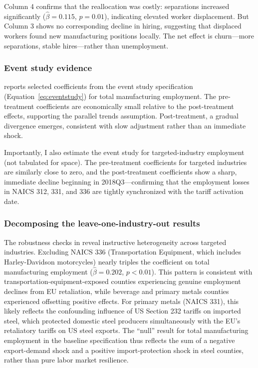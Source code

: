 \documentclass[12pt]{article}
\begin{document}
Column 4 confirms that the reallocation was costly: separations increased significantly ($\hat{\beta} = 0.115$, $p = 0.01$), indicating elevated worker displacement. But Column 3 shows no corresponding decline in hiring, suggesting that displaced workers found new manufacturing positions locally. The net effect is churn---more separations, stable hires---rather than unemployment.



\subsubsection*{Event study evidence}  reports selected coefficients from the event study specification (Equation~\ref{eq:eventstudy}) for total manufacturing employment. The pre-treatment coefficients are economically small relative to the post-treatment effects, supporting the parallel trends assumption. Post-treatment, a gradual divergence emerges, consistent with slow adjustment rather than an immediate shock.

Importantly, I also estimate the event study for targeted-industry employment (not tabulated for space). The pre-treatment coefficients for targeted industries are similarly close to zero, and the post-treatment coefficients show a sharp, immediate decline beginning in 2018Q3---confirming that the employment losses in NAICS 312, 331, and 336 are tightly synchronized with the tariff activation date.



\subsubsection*{Decomposing the leave-one-industry-out results} The robustness checks in  reveal instructive heterogeneity across targeted industries. Excluding NAICS 336 (Transportation Equipment, which includes Harley-Davidson motorcycles) nearly triples the coefficient on total manufacturing employment ($\hat{\beta} = 0.202$, $p < 0.01$). This pattern is consistent with transportation-equipment-exposed counties experiencing genuine employment declines from EU retaliation, while beverage and primary metals counties experienced offsetting positive effects. For primary metals (NAICS 331), this likely reflects the confounding influence of US Section 232 tariffs on imported steel, which protected domestic steel producers simultaneously with the EU's retaliatory tariffs on US steel exports. The ``null'' result for total manufacturing employment in the baseline specification thus reflects the sum of a negative export-demand shock and a positive import-protection shock in steel counties, rather than pure labor market resilience.
\end{document}
